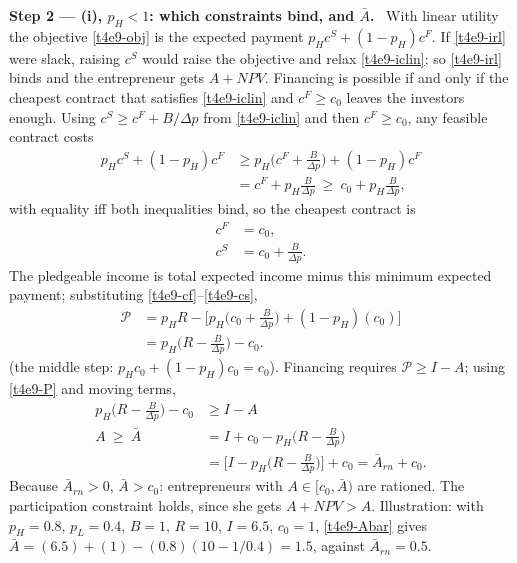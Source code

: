 \documentclass[11pt,a4paper]{article}
\newcommand{\step}[2]{\par\medskip\noindent\textbf{Step #1 --- #2.}~}
\begin{document}
\step{2}{(i), $p_H<1$: which constraints bind, and $\bar A$} With linear utility the objective
\eqref{t4e9-obj} is the expected payment $p_Hc^S+(1-p_H)c^F$. If \eqref{t4e9-irl} were slack, raising
$c^S$ would raise the objective and relax \eqref{t4e9-iclin}; so \eqref{t4e9-irl} binds and the
entrepreneur gets $A+\mathit{NPV}$. Financing is possible if and only if the cheapest contract that
satisfies \eqref{t4e9-iclin} and $c^F\ge c_0$ leaves the investors enough. Using
$c^S\ge c^F+B/\Delta p$ from \eqref{t4e9-iclin} and then $c^F\ge c_0$, any feasible contract costs
\begin{align}
  p_Hc^S+(1-p_H)c^F &\ge p_H\Big(c^F+\frac{B}{\Delta p}\Big)+(1-p_H)c^F \nonumber\\
                    &= c^F+p_H\frac{B}{\Delta p} \ \ge\ c_0+p_H\frac{B}{\Delta p}, \nonumber
\end{align}
with equality iff both inequalities bind, so the cheapest contract is
\begin{align}
  c^F &= c_0, \label{t4e9-cf}\\
  c^S &= c_0+\frac{B}{\Delta p}. \label{t4e9-cs}
\end{align}
The pledgeable income is total expected income minus this minimum expected payment; substituting
\eqref{t4e9-cf}--\eqref{t4e9-cs},
\begin{align}
  \mathcal{P} &= p_HR-\Big[p_H\Big(c_0+\frac{B}{\Delta p}\Big)+(1-p_H)(c_0)\Big] \nonumber\\
              &= p_H\Big(R-\frac{B}{\Delta p}\Big)-c_0. \label{t4e9-P}
\end{align}
(the middle step: $p_Hc_0+(1-p_H)c_0=c_0$). Financing requires $\mathcal{P}\ge I-A$; using
\eqref{t4e9-P} and moving terms,
\begin{align}
  p_H\Big(R-\frac{B}{\Delta p}\Big)-c_0 &\ge I-A \nonumber\\
  A \ \ge\ \bar A &= I+c_0-p_H\Big(R-\frac{B}{\Delta p}\Big) \label{t4e9-Abar}\\
                  &= \Big[I-p_H\Big(R-\frac{B}{\Delta p}\Big)\Big]+c_0=\bar A_{rn}+c_0. \nonumber
\end{align}
Because $\bar A_{rn}>0$, $\bar A>c_0$: entrepreneurs with $A\in[c_0,\bar A)$ are rationed. The
participation constraint holds, since she gets $A+\mathit{NPV}>A$. Illustration: with
$p_H=0.8$, $p_L=0.4$, $B=1$, $R=10$, $I=6.5$, $c_0=1$, \eqref{t4e9-Abar} gives
$\bar A=(6.5)+(1)-(0.8)(10-1/0.4)=1.5$, against $\bar A_{rn}=0.5$.
\end{document}

